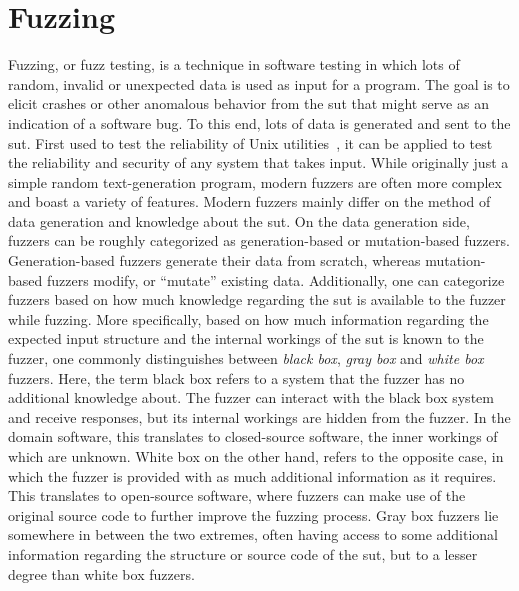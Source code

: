 \section{Fuzzing}
Fuzzing, or fuzz testing, is a technique in software testing in which lots of random, invalid or unexpected data is used as input for a program. The goal is to elicit crashes or other anomalous behavior from the \ac{sut} that might serve as an indication of a software bug. To this end, lots of data is generated and sent to the \ac{sut}. First used to test the reliability of Unix utilities~\cite{miller1990empirical}, it can be applied to test the reliability and security of any system that takes input. While originally just a simple random text-generation program, modern fuzzers are often more complex and boast a variety of features. Modern fuzzers mainly differ on the method of data generation and knowledge about the \ac{sut}. On the data generation side, fuzzers can be roughly categorized as generation-based or mutation-based fuzzers. Generation-based fuzzers generate their data from scratch, whereas mutation-based fuzzers modify, or ``mutate'' existing data. Additionally, one can categorize fuzzers based on how much knowledge regarding the \ac{sut} is available to the fuzzer while fuzzing. More specifically, based on how much information regarding the expected input structure and the internal workings of the \ac{sut} is known to the fuzzer, one commonly distinguishes between \emph{black box}, \emph{gray box} and \emph{white box} fuzzers. Here, the term black box refers to a system that the fuzzer has no additional knowledge about. The fuzzer can interact with the black box system and receive responses, but its internal workings are hidden from the fuzzer. In the domain software, this translates to closed-source software, the inner workings of which are unknown. White box on the other hand, refers to the opposite case, in which the fuzzer is provided with as much additional information as it requires. This translates to open-source software, where fuzzers can make use of the original source code to further improve the fuzzing process. Gray box fuzzers lie somewhere in between the two extremes, often having access to some additional information regarding the structure or source code of the \ac{sut}, but to a lesser degree than white box fuzzers.

